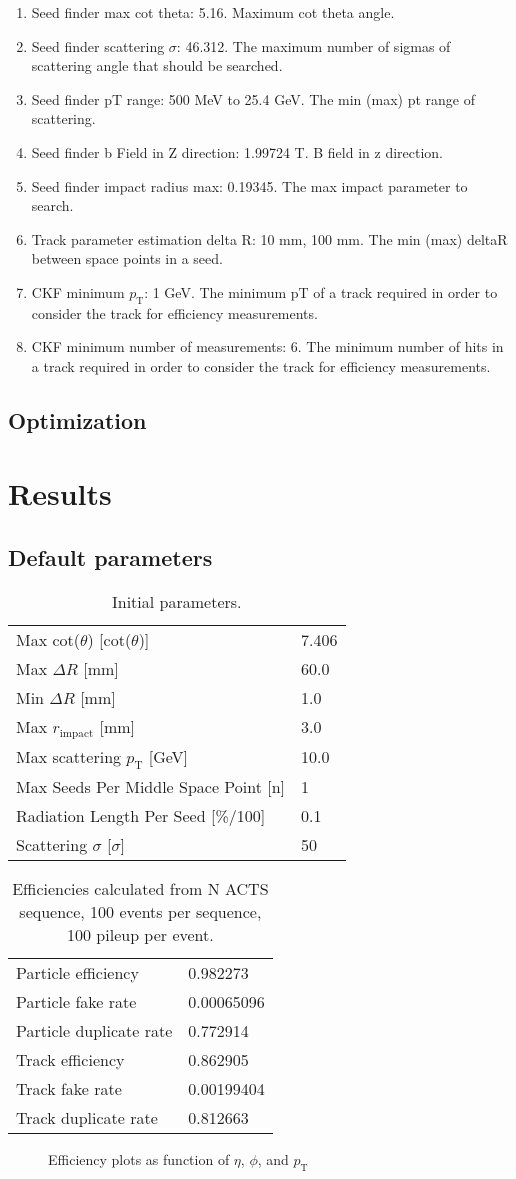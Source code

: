 \documentclass{article}
\newcommand{\pic}[2]{\beg{center}{\texttt{[image: \#2]}}}
\newcommand{\figpic}[3]{
\begin{figure}[H]
\begin{center}
\pic{#1}{#2}
\caption{#3}
\end{center}
\end{figure}}
\newcommand{\figtab}[3]{
\begin{table}[H]
\begin{tabular}{#1}
#2
\end{tabular}
\caption{#3}
\end{table}}
\newcommand{\pt}[0]{p_\textrm{T}}
\begin{document}
\begin{enumerate}
\item Seed finder max cot theta: 5.16. Maximum cot theta angle.
\item Seed finder scattering $\sigma$: 46.312. The maximum number of sigmas of scattering angle that should be searched.
\item Seed finder pT range: 500 MeV to 25.4 GeV. The min (max) pt range of scattering.
\item Seed finder b Field in Z direction: 1.99724 T. B field in z direction.
\item Seed finder impact radius max: 0.19345. The max impact parameter to search.
\item Track parameter estimation delta R: 10 mm, 100 mm. The min (max) deltaR between space points in a seed.
\item CKF minimum $\pt$: 1 GeV. The minimum pT of a track required in order to consider the track for efficiency measurements.
\item CKF minimum number of measurements: 6. The minimum number of hits in a track required in order to consider the track for efficiency measurements.
\end{enumerate}

\subsection{\label{b87dfa0}Optimization}
\section{Results}
\subsection{Default parameters}
\figtab{l l}{Max \textrm{cot}($\theta$) [\textrm{cot}($\theta$)] & 7.406\\
Max $\Delta R$ [mm] & 60.0\\
Min $\Delta R$ [mm]  & 1.0\\
Max $r_\textrm{impact}$ [mm] & 3.0\\
Max scattering $p_{\textrm{T}}$ [GeV] & 10.0\\
Max Seeds Per Middle Space Point [n] & 1\\
Radiation Length Per Seed [\%/100] & 0.1\\
Scattering $\sigma$ [$\sigma$] & 50
}{\label{192837a}Initial parameters.}
\figtab{l l}{
Particle efficiency &0.982273\\
Particle fake rate &0.00065096\\
Particle duplicate rate &0.772914\\
Track efficiency &0.862905\\
Track fake rate &0.00199404\\
Track duplicate rate &0.812663
}{Efficiencies calculated from N ACTS sequence, 100 events per sequence, 100 pileup per event.}
\figpic{9cm}{4.png}{Efficiency plots as function of $\eta$, $\phi$, and $\pt$}
\end{document}
